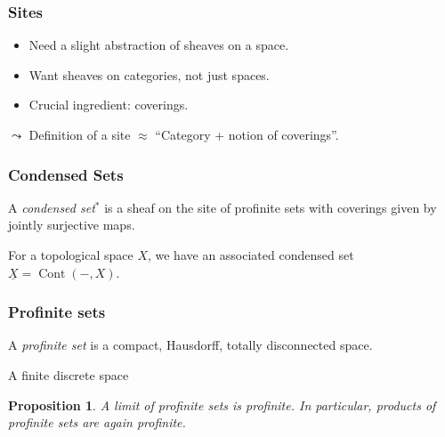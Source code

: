 \documentclass{beamer}
\newtheorem{proposition}{Proposition}
\DeclareMathOperator{\opp}{opp}
\DeclareMathOperator{\Cont}{Cont}
\begin{document}
\begin{frame}
    \frametitle{Sites}

    \begin{itemize}
        \item Need a slight abstraction of sheaves on a space.
        \item Want sheaves on categories, not just spaces.
        \item Crucial ingredient: coverings.
    \end{itemize}
    \medskip

    \pause
    $\leadsto$ Definition of a site $\approx $ ``Category + notion of coverings''.

\end{frame}

\begin{frame}
    \frametitle{Condensed Sets}

    \begin{definition}
        A \emph{condensed set}$^*$ is a sheaf on the site of profinite sets
        with coverings given by jointly surjective maps.
    \end{definition}
    \medskip
    \pause

    For a topological space $X$, we have an associated
    condensed set $\underline{X} = \Cont(-, X)$.

\end{frame}
\begin{frame}
    \frametitle{Profinite sets}


    \begin{definition}
        A \emph{profinite set} is a compact, Hausdorff, totally disconnected space.
    \end{definition}
    \begin{example}
        A finite discrete space
    \end{example}
    \pause

    \begin{proposition}
        A limit of profinite sets is profinite.
        In particular, products of profinite sets
        are again profinite.
    \end{proposition}

\end{frame}
\end{document}

